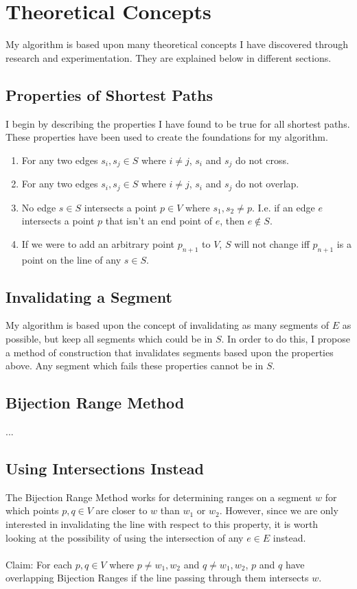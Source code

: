 \documentclass[12pt]{article}
\begin{document}
\section{Theoretical Concepts}\label{sec:theory}
My algorithm is based upon many theoretical concepts I have discovered through
research and experimentation. They are explained below in different sections.

\subsection{Properties of Shortest Paths}\label{subsec:props}
I begin by describing the properties I have found to be true for all shortest
paths. These properties have been used to create the foundations for my algorithm.
\begin{enumerate}
\item For any two edges $s_i,s_j \in S$ where $i \neq j$, $s_i$ and $s_j$ do not cross. 
\item For any two edges $s_i,s_j \in S$ where $i \neq j$, $s_i$ and $s_j$ do not overlap. 
\item No edge $s \in S$ intersects a point $p \in V$ where $s_1,s_2 \neq p$.
I.e. if an edge $e$ intersects a point $p$ that isn't an end point of $e$,
then $e \notin S$.
\item If we were to add an arbitrary point $p_{n+1}$ to $V$, $S$
will not change iff $p_{n+1}$ is a point on the line of any $s \in S$.
\end{enumerate}

\subsection{Invalidating a Segment}\label{subsec:invalid}
My algorithm is based upon the concept of invalidating as many segments of $E$
as possible, but keep all segments which could be in $S$. In order to do this,
I propose a method of construction that invalidates segments based upon the properties
above. Any segment which fails these properties cannot be in $S$.

\subsection*{Bijection Range Method}\label{subsec*:bijection-range-method}
...

\subsection*{Using Intersections Instead}\label{subsec*:intersection-method}
The Bijection Range Method works for determining ranges on a segment $w$
for which points $p,q \in V$ are closer to $w$ than $w_1$ or $w_2$.
However, since we are only interested
in invalidating the line with respect to this property, it is worth looking at
the possibility of using the intersection of any $e \in E$ instead.
\\\\
Claim: For each $p,q \in V$ where $p \neq w_1,w_2$ and $q \neq w_1,w_2$,
$p$ and $q$ have overlapping Bijection Ranges
if the line passing through them intersects $w$.
\end{document}
